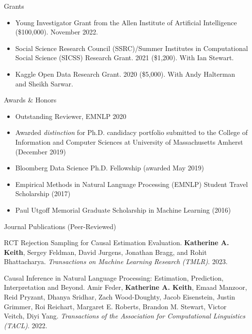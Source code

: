 \documentclass{resume} %
\begin{document}
\begin{rSection}{Grants}
\begin{itemize}
\item Young Investigator Grant from the Allen Institute of Artificial Intelligence (\$100,000). November 2022. 
\item  Social Science Research Council (SSRC)/Summer Institutes in Computational Social Science (SICSS) Research Grant. 2021 (\$1,200). With Ian Stewart. 
\item  Kaggle Open Data Research Grant. 2020 (\$5,000). With Andy Halterman and Sheikh Sarwar.
\end{itemize}

\end{rSection}

\begin{rSection}{Awards \& Honors}
\begin{itemize}
\item Outstanding Reviewer, EMNLP 2020
\item Awarded \emph{distinction} for Ph.D. candidacy portfolio submitted to the College of Information and Computer Sciences at University of Massachusetts Amherst (December 2019) 
\item Bloomberg Data Science Ph.D. Fellowship (awarded May 2019)  
\item Empirical Methods in Natural Language Processing (EMNLP) Student Travel Scholarship (2017)
\item Paul Utgoff Memorial Graduate Scholarship in Machine Learning (2016) 
\end{itemize} 
\end{rSection}


%
\begin{rSection}{Journal Publications (Peer-Reviewed)}
\begin{etaremune}

\item RCT Rejection Sampling for Causal Estimation Evaluation. 
\textbf{Katherine A. Keith}, Sergey Feldman, David Jurgens, Jonathan Bragg, and Rohit Bhattacharya.
\emph{Transactions on Machine Learning Research (TMLR)}. 2023.  


\item Causal Inference in Natural Language Processing: Estimation, Prediction, Interpretation and Beyond. Amir Feder, \textbf{Katherine A. Keith}, Emaad Manzoor, Reid Pryzant, Dhanya Sridhar, Zach Wood-Doughty, Jacob Eisenstein, Justin Grimmer, Roi Reichart, Margaret E. Roberts, Brandon M. Stewart, Victor Veitch, Diyi Yang.
\emph{Transactions of the Association for Computational Linguistics (TACL)}. 2022.  

\end{etaremune}
\end{rSection}
\end{document}
